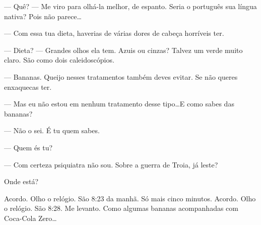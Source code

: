 --- Quê? --- Me viro para olhá-la melhor, de espanto. Seria o português sua língua nativa? Pois não parece\ldots

--- Com essa tua dieta, haverias de várias dores de cabeça horríveis ter.

--- Dieta? --- Grandes olhos ela tem. Azuis ou cinzas? Talvez um verde muito claro. São como dois caleidoscópios.

--- Bananas. Queijo nesses tratamentos também deves evitar. Se não queres enxaquecas ter.

--- Mas eu não estou em nenhum tratamento desse tipo\ldots\linebreak E como sabes das bananas?

--- Não o sei. É tu quem sabes.

--- Quem és tu?

--- Com certeza psiquiatra não sou. Sobre a guerra de Troia, já leste?

Onde está?

Acordo. Olho o relógio. São 8:23 da manhã. Só mais cinco minutos. Acordo. Olho o relógio. São 8:28. Me levanto. Como algumas bananas acompanhadas com Coca-Cola Zero\ldots
